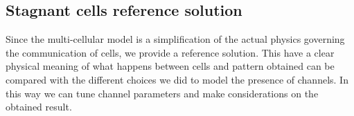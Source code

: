\subsection{Stagnant cells reference solution}\label{sec:refRR}
Since the multi-cellular model is a simplification of the actual physics governing the communication of cells, we provide a reference solution. This have a clear physical meaning of what happens between cells and pattern obtained can be compared with the different choices we did to model the presence of channels. In this way we can tune channel parameters and make considerations on the obtained result.

